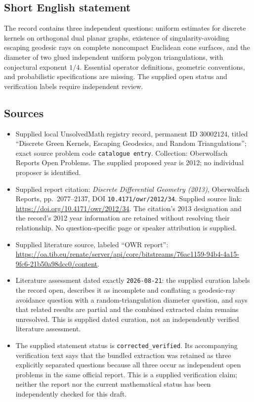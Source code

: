 \documentclass[11pt]{article}
\begin{document}
\subsection{Short English statement}
The record contains three independent questions: uniform estimates for discrete kernels on orthogonal dual planar graphs, existence of singularity-avoiding escaping geodesic rays on complete noncompact Euclidean cone surfaces, and the diameter of two glued independent uniform polygon triangulations, with conjectural exponent \(1/4\). Essential operator definitions, geometric conventions, and probabilistic specifications are missing. The supplied open status and verification labels require independent review.
\subsection{Sources}
\begin{itemize}
\item Supplied local UnsolvedMath registry record, permanent ID \(30002124\), titled ``Discrete Green Kernels, Escaping Geodesics, and Random Triangulations''; exact source problem code \texttt{catalogue entry}. Collection: Oberwolfach Reports Open Problems. The supplied proposed year is 2012; no individual proposer is identified.
\item Supplied report citation: \emph{Discrete Differential Geometry (2013)}, Oberwolfach Reports, pp.\ 2077--2137, DOI \texttt{10.4171/owr/2012/34}. Supplied source link: \url{https://doi.org/10.4171/owr/2012/34}. The citation's 2013 designation and the record's 2012 year information are retained without resolving their relationship. No question-specific page or speaker attribution is supplied.
\item Supplied literature source, labeled ``OWR report'': \url{https://oa.tib.eu/renate/server/api/core/bitstreams/76ac1159-94b4-4a15-9fc6-21b50a98dcc0/content}.
\item Literature assessment dated exactly \texttt{2026-08-21}: the supplied curation labels the record open, describes it as incomplete and conflating a geodesic-ray avoidance question with a random-triangulation diameter question, and says that related results are partial and the combined extracted claim remains unresolved. This is supplied dated curation, not an independently verified literature assessment.
\item The supplied statement status is \texttt{corrected\_verified}. Its accompanying verification text says that the bundled extraction was retained as three explicitly separated questions because all three occur as independent open problems in the same official report. This is a supplied verification claim; neither the report nor the current mathematical status has been independently checked for this draft.
\end{itemize}
\end{document}
